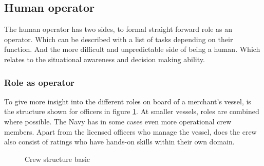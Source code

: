 \subsection{Human operator}
The human operator has two sides, to formal straight forward role as an operator. Which can be described with a list of tasks depending on their function. And the more difficult and unpredictable side of being a human. Which relates to the situational awareness and decision making ability.

\subsubsection{Role as operator}
\label{sec:deck-crew}
To give more insight into the different roles on board of a merchant's vessel, is the structure shown for officers in figure \ref{fig:crew-structure}. At smaller vessels, roles are combined where possible. The Navy has in some cases even more operational crew members. Apart from the licensed officers who manage the vessel, does the crew also consist of ratings who have hands-on skills within their own domain. \cite{Nedcon2013}

\begin{figure}[h]
	\centering
	\caption{Crew structure basic}
	\label{fig:crew-structure}
\end{figure}

